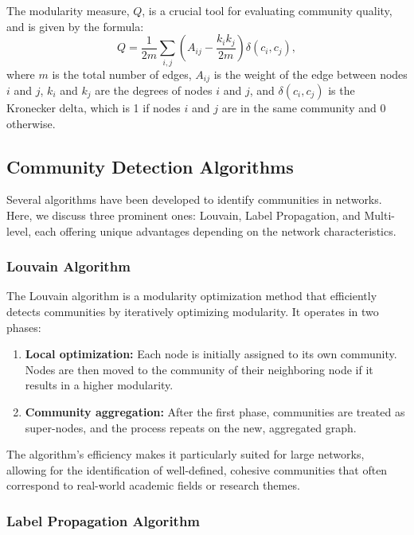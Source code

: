 \documentclass[11pt]{article}
\begin{document}
The modularity measure, \( Q \), is a crucial tool for evaluating community quality, and is given by the formula:
\[
Q = \frac{1}{2m} \sum_{i,j} \left( A_{ij} - \frac{k_i k_j}{2m} \right) \delta(c_i, c_j),
\]
where \( m \) is the total number of edges, \( A_{ij} \) is the weight of the edge between nodes \( i \) and \( j \), \( k_i \) and \( k_j \) are the degrees of nodes \( i \) and \( j \), and \( \delta(c_i, c_j) \) is the Kronecker delta, which is 1 if nodes \( i \) and \( j \) are in the same community and 0 otherwise.

\subsection{Community Detection Algorithms}

Several algorithms have been developed to identify communities in networks. Here, we discuss three prominent ones: Louvain, Label Propagation, and Multi-level, each offering unique advantages depending on the network characteristics.

\subsubsection{Louvain Algorithm}

The Louvain algorithm is a modularity optimization method that efficiently detects communities by iteratively optimizing modularity. It operates in two phases:

\begin{enumerate}
    \item \textbf{Local optimization:} Each node is initially assigned to its own community. Nodes are then moved to the community of their neighboring node if it results in a higher modularity.
    \item \textbf{Community aggregation:} After the first phase, communities are treated as super-nodes, and the process repeats on the new, aggregated graph.
\end{enumerate}

The algorithm’s efficiency makes it particularly suited for large networks, allowing for the identification of well-defined, cohesive communities that often correspond to real-world academic fields or research themes.

\subsubsection{Label Propagation Algorithm}
\end{document}
